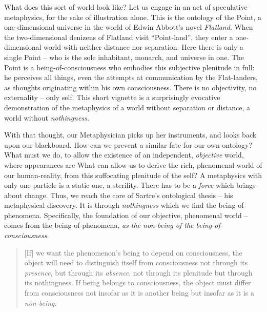 \noindent
What does this sort of world look like? Let us engage in an act of speculative metaphysics, for the sake of illustration alone. This is the ontology of the Point, a one-dimensional universe in the world of Edwin Abbott's novel \emph{Flatland}. When the two-dimensional denizens of Flatland visit \enquote{Point-land}, they enter a one-dimensional world with neither distance nor separation. Here there is only a single Point -- who is the sole inhabitant, monarch, and universe in one. The Point is a being-of-consciousness who embodies this subjective plenitude in full: he perceives all things, even the attempts at communication by the Flat-landers, as thoughts originating within his own consciousness. There is no objectivity, no externality -- only self. This short vignette is a surprisingly evocative demonstration of the metaphysics of a world without separation or distance, a world without \emph{nothingness.}

With that thought, our Metaphysician picks up her instruments, and looks back upon our blackboard. How can we prevent a similar fate for our own ontology? What must we do, to allow the existence of an independent, \emph{objective} world, where appearances are  
What can allow us to derive the rich, phenomenal world of our human-reality, from this suffocating plenitude of the self? A metaphysics with only one particle is a static one, a sterility. There has to be a \emph{force} which brings about change. Thus, we reach the core of Sartre's ontological thesis -- his metaphysical discovery. It is through \emph{nothingness} which we find the being-of-phenomena. Specifically, the foundation of our objective, phenomenal world -- comes from the being-of-phenomena, \emph{as the non-being of the being-of-consciousness.}

\blockcquote[21]{Sartre}{[If] we want the phenomenon's being to depend on consciousness, the object will need to distinguish itself from consciousness not through its \emph{presence}, but through its \emph{absence}, not through its plenitude but through its nothingness. If being belongs to consciousness, the object must differ from consciousness not insofar as it is another being but insofar as it is a \emph{non-being}.}


